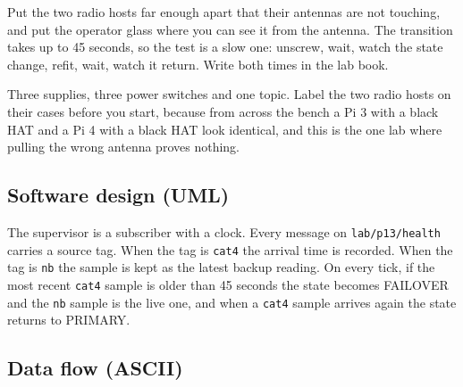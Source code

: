 
Put the two radio hosts far enough apart that their antennas are not touching, and put the operator glass where you can see it from the antenna. The transition takes up to 45 seconds, so the test is a slow one: unscrew, wait, watch the state change, refit, wait, watch it return. Write both times in the lab book.

Three supplies, three power switches and one topic. Label the two radio hosts on their cases before you start, because from across the bench a Pi 3 with a black HAT and a Pi 4 with a black HAT look identical, and this is the one lab where pulling the wrong antenna proves nothing.

\subsection*{Software design (UML)}


The supervisor is a subscriber with a clock. Every message on \texttt{lab/p13/health} carries a source tag. When the tag is \texttt{cat4} the arrival time is recorded. When the tag is \texttt{nb} the sample is kept as the latest backup reading. On every tick, if the most recent \texttt{cat4} sample is older than 45 seconds the state becomes FAILOVER and the \texttt{nb} sample is the live one, and when a \texttt{cat4} sample arrives again the state returns to PRIMARY.

\subsection*{Data flow (ASCII)}

